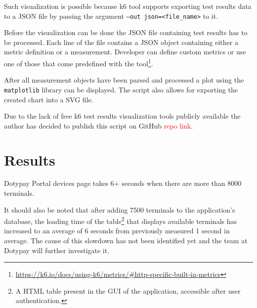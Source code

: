 \documentclass[12pt, a4paper]{article}
\newcommand\todo[1]{\textcolor{red}{#1}}
\let\oldsection\section
\renewcommand\section{\clearpage\oldsection}
\begin{document}
Such visualization is possible because k6 tool supports exporting test results data to a JSON file by passing the argument \texttt{--out json=<file\_name>} to it.

Before the visualization can be done the JSON file containing test results has to be processed.
Each line of the file contains a JSON object containing either a metric definition or a measurement.
Developer can define custom metrics or use one of those that come predefined with the tool\footnote{\url{https://k6.io/docs/using-k6/metrics/#http-specific-built-in-metrics}}.

After all measurement objects have been parsed and processed a plot using the \texttt{matplotlib} library can be displayed.
The script also allows for exporting the created chart into a SVG file.

Due to the lack of free k6 test results visualization tools publicly available the author has decided to publish this script on GitHub \todo{repo link}.

\section{Results}
Dotypay Portal devices page takes 6+ seconds when there are more than 8000 terminals.

It should also be noted that after adding 7500 terminals to the application's database, the loading time of the table\footnote{A HTML table present in the GUI of the application, accessible after user authentication.} that displays available terminals has increased to an average of 6 seconds from previously measured 1 second in average.
The cause of this slowdown has not been identified yet and the team at Dotypay will further investigate it.
\end{document}
